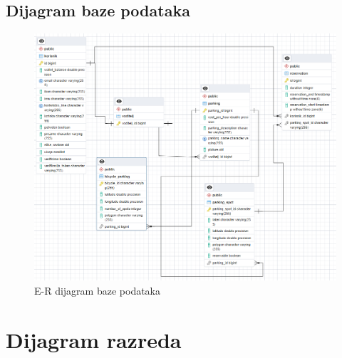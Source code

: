 \subsection{Dijagram baze podataka}


\begin{figure}[H]
	\includegraphics[width=\textwidth]{slike/baza_podataka.png} %
	\centering
	\caption{E-R dijagram baze podataka}
\end{figure}








\eject


\section{Dijagram razreda}




